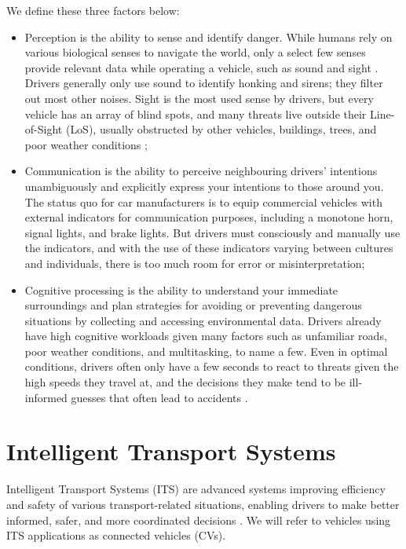 We define these three factors below:
\begin{itemize}
	\item Perception is the ability to sense and identify danger. While humans rely on various biological senses to navigate the world, only a select few senses provide relevant data while operating a vehicle, such as sound and sight \cite{Sukru2020}. Drivers generally only use sound to identify honking and sirens; they filter out most other noises. Sight is the most used sense by drivers, but every vehicle has an array of blind spots, and many threats live outside their Line-of-Sight (\acrshort{LoS}), usually obstructed by other vehicles, buildings, trees, and poor weather conditions \cite{Sukru2020};
	
	\item Communication is the ability to perceive neighbouring drivers' intentions unambiguously and explicitly express your intentions to those around you. The status quo for car manufacturers is to equip commercial vehicles with external indicators for communication purposes, including a monotone horn, signal lights, and brake lights. But drivers must consciously and manually use the indicators, and with the use of these indicators varying between cultures and individuals, there is too much room for error or misinterpretation;
	
	\item Cognitive processing is the ability to understand your immediate surroundings and plan strategies for avoiding or preventing dangerous situations by collecting and accessing environmental data. Drivers already have high cognitive workloads given many factors such as unfamiliar roads, poor weather conditions, and multitasking, to name a few. Even in optimal conditions, drivers often only have a few seconds to react to threats given the high speeds they travel at, and the decisions they make tend to be ill-informed guesses that often lead to accidents \cite{Buchenscheit2009}.
\end{itemize}


\section{Intelligent Transport Systems}

Intelligent Transport Systems (\acrshort{ITS}) are advanced systems improving efficiency and safety of various transport-related situations, enabling drivers to make better informed, safer, and more coordinated decisions \cite{Huang2009, Khare2020, Beneoks2019, Drop2021}. We will refer to vehicles using \acrshort{ITS} applications as connected vehicles (CVs).

